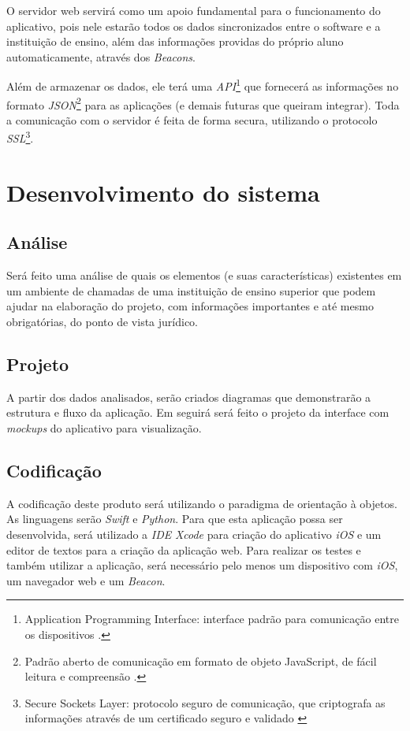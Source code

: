\documentclass[
	12pt,
	oneside,
	a4paper,
	english,
	brazil,
]{abntex2}
\begin{document}
O servidor web servirá como um apoio fundamental para o funcionamento do aplicativo, pois nele estarão todos os dados sincronizados entre o software e a instituição de ensino, além das informações providas do próprio aluno automaticamente, através dos \emph{Beacons}.

Além de armazenar os dados, ele terá uma \emph{API}\footnote{Application Programming Interface: interface padrão para comunicação entre os dispositivos \cite{footnote-api}.} que fornecerá as informações no formato \emph{JSON}\footnote{Padrão aberto de comunicação em formato de objeto JavaScript, de fácil leitura e compreensão \cite{footnote-json}.} para as aplicações (e demais futuras que queiram integrar). Toda a comunicação com o servidor é feita de forma secura, utilizando o protocolo \emph{SSL}\footnote{Secure Sockets Layer: protocolo seguro de comunicação, que criptografa as informações através de um certificado seguro e validado \cite{footnote-ssl}}. 

\section{Desenvolvimento do sistema}
\subsection{Análise}

Será feito uma análise de quais os elementos (e suas características) existentes em um ambiente de chamadas de uma instituição de ensino superior que podem ajudar na elaboração do projeto, com informações importantes e até mesmo obrigatórias, do ponto de vista jurídico.

\subsection{Projeto}

A partir dos dados analisados, serão criados diagramas que demonstrarão a estrutura e fluxo da aplicação. Em seguirá será feito o projeto da interface com \emph{mockups} do aplicativo para visualização.

\subsection{Codificação}

A codificação deste produto será utilizando o paradigma de orientação à objetos. As linguagens serão \emph{Swift} e \emph{Python}. Para que esta aplicação possa ser desenvolvida, será utilizado a \emph{IDE} \emph{Xcode} para criação do aplicativo \emph{iOS} e um editor de textos para a criação da aplicação web. Para realizar os testes e também utilizar a aplicação, será necessário pelo menos um dispositivo com \emph{iOS}, um navegador web e um \emph{Beacon}.
\end{document}
